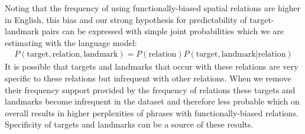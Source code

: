 Noting that the frequency of using functionally-biased spatial relations are higher in English, this bias and our strong hypothesis for predictability of target-landmark pairs can be expressed with simple joint probabilities which we are estimating with the language model:
\begin{align*}
  P(\mathrm{target, relation, landmark}) = P(\mathrm{relation}) P(\mathrm{target, landmark | relation})
\end{align*}
It is possible that targets and landmarks that occur with
these relations are very specific to these relations but
infrequent with other relations. When we remove their frequency
support provided by the frequency of relations
these targets and landmarks become infrequent in the dataset and
therefore less probable which on overall results in higher
perplexities of phrases with functionally-biased relations. Specificity of targets and landmarks can be a source of these results.


